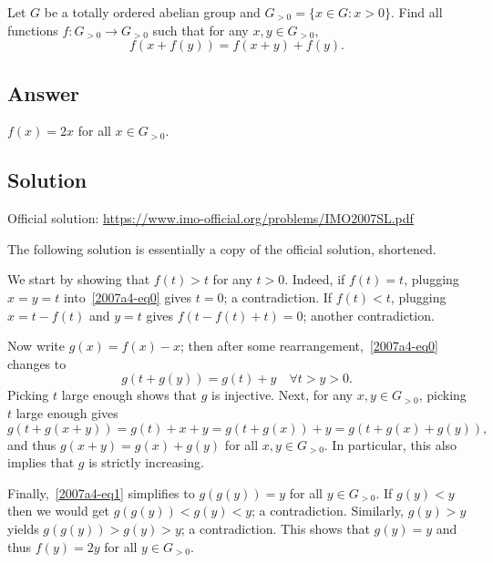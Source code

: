 Let $G$ be a totally ordered abelian group and $G_{>0} = \{x \in G : x > 0\}$.
Find all functions $f : G_{>0} \to G_{>0}$ such that for any $x, y \in G_{>0}$,
\[ f(x + f(y)) = f(x + y) + f(y). \tag{*}\label{2007a4-eq0} \]



\subsection*{Answer}

$f(x) = 2x$ for all $x \in G_{>0}$.



\subsection*{Solution}

Official solution: \url{https://www.imo-official.org/problems/IMO2007SL.pdf}

The following solution is essentially a copy of the official solution, shortened.

We start by showing that $f(t) > t$ for any $t > 0$.
Indeed, if $f(t) = t$, plugging $x = y = t$ into~\eqref{2007a4-eq0} gives $t = 0$; a contradiction.
If $f(t) < t$, plugging $x = t - f(t)$ and $y = t$ gives $f(t - f(t) + t) = 0$; another contradiction.

Now write $g(x) = f(x) - x$; then after some rearrangement,~\eqref{2007a4-eq0} changes to
\[ g(t + g(y)) = g(t) + y \quad \forall t > y > 0. \tag{1}\label{2007a4-eq1} \]
Picking $t$ large enough shows that $g$ is injective.
Next, for any $x, y \in G_{>0}$, picking $t$ large enough gives
\[ g(t + g(x + y)) = g(t) + x + y = g(t + g(x)) + y = g(t + g(x) + g(y)), \]
    and thus $g(x + y) = g(x) + g(y)$ for all $x, y \in G_{>0}$.
In particular, this also implies that $g$ is strictly increasing.

Finally,~\eqref{2007a4-eq1} simplifies to $g(g(y)) = y$ for all $y \in G_{>0}$.
If $g(y) < y$ then we would get $g(g(y)) < g(y) < y$; a contradiction.
Similarly, $g(y) > y$ yields $g(g(y)) > g(y) > y$; a contradiction.
This shows that $g(y) = y$ and thus $f(y) = 2y$ for all $y \in G_{>0}$.
